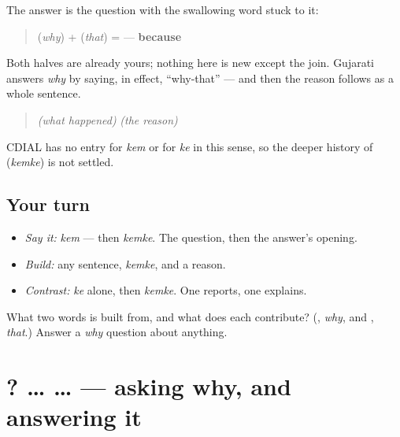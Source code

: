 \begin{cousinweb}
The answer is the question with the swallowing word stuck to it:

\begin{quote}
\textbf{} (\emph{why}) + \textbf{} (\emph{that}) = \textbf{} — \textbf{because}
\end{quote}

Both halves are already yours; nothing here is new except the join. Gujarati answers \emph{why} by saying, in effect, \textquotedblleft{}why-that\textquotedblright{} — and then the reason follows as a whole sentence.

\begin{quote}
\emph{(what happened)} \textbf{} \emph{(the reason)}
\end{quote}

CDIAL has no entry for \emph{kem} or for \emph{ke} in this sense, so the deeper history of \textbf{} (\emph{kemke}) is not settled.
\end{cousinweb}

\subsection*{Your turn}
\begin{itemize}
\raggedright
  \item \emph{Say it:} \emph{kem} — then \emph{kemke}. The question, then the answer's opening.
  \item \emph{Build:} any sentence, \emph{kemke}, and a reason.
  \item \emph{Contrast:} \emph{ke} alone, then \emph{kemke}. One reports, one explains.
\end{itemize}

\begin{tcolorbox}[breakable,colback=teal!4,colframe=teal!35!black,title={Before you move on}]
What two words is \textbf{} built from, and what does each contribute? (\textbf{}, \emph{why}, and \textbf{}, \emph{that}.) Answer a \emph{why} question about anything.
\end{tcolorbox}
\section[\texorpdfstring{\gu{કેમ}? … \gu{કેમકે} … (kem? … kemke …)}{કેમ? … કેમકે … (kem? … kemke …)}]{? …  … — asking why, and answering it}

\label{lesson:GU-C34-kem-kemke}




